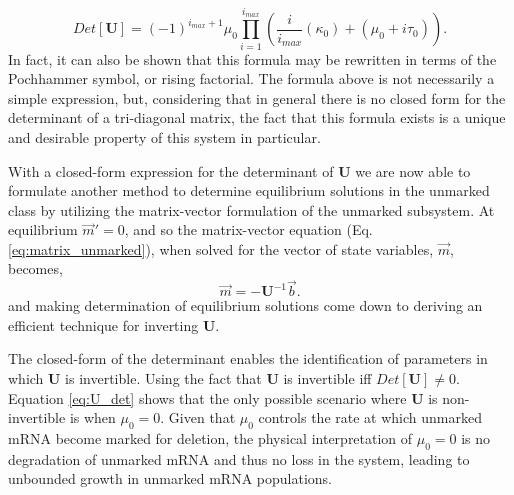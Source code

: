 \documentclass[review]{elsarticle}
\let\bs\boldsymbol
\begin{document}
\begin{equation}\label{eq:U_det}
Det[\bs{U}]=(-1)^{i_{max}+1}\mu_0\prod_{i=1}^{i_{max}}{\left(\frac{i}{i_{max}}(\kappa_0)+(\mu_0+i\tau_0)\right)}.
\end{equation}
In fact, it can also be shown that this formula may be rewritten in terms of the Pochhammer symbol, or rising factorial.
The formula above is not necessarily a simple expression, but, considering that in general there is no closed form for the determinant of a tri-diagonal matrix, the fact that this formula exists is a unique and desirable property of this system in particular.

With a closed-form expression for the determinant of $\bs{U}$ we are now able to formulate another method to determine equilibrium solutions in the unmarked class by utilizing the matrix-vector formulation of the unmarked subsystem.
At equilibrium $\vec{m}'=0$, and so the matrix-vector equation (Eq. \ref{eq:matrix_unmarked}), when solved for the vector of state variables, $\vec{m}$, becomes,
\begin{equation}
\vec{m}=-\bs{U}^{-1}\vec{b}.
\end{equation}
and making determination of equilibrium solutions come down to deriving an efficient technique for inverting $\bs{U}$.  

The closed-form of the determinant enables the identification of parameters in which $\bs{U}$ is invertible.
Using the fact that $\bs{U}$ is invertible iff $Det[\bs{U}]\neq0$.
Equation \ref{eq:U_det} shows that the only possible scenario where $\bs{U}$ is non-invertible is when $\mu_0=0$.
Given that $\mu_0$ controls the rate at which unmarked mRNA become marked for deletion, the physical interpretation of $\mu_0=0$ is no degradation of unmarked mRNA and thus no loss in the system, leading to unbounded growth in unmarked mRNA populations.
\end{document}
